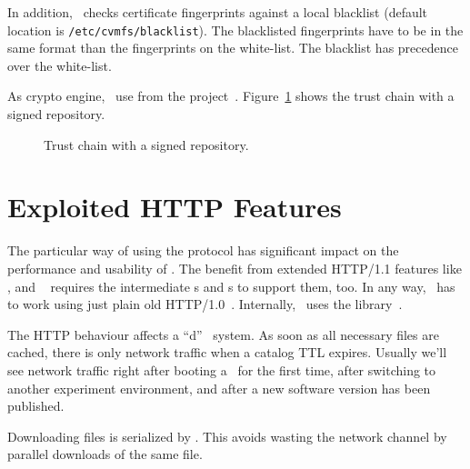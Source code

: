 In addition, \cvmfs\ checks certificate fingerprints against a local blacklist (default location is \texttt{/etc/cvmfs/blacklist}).
The blacklisted fingerprints have to be in the same format than the fingerprints on the white-list.
The blacklist has precedence over the white-list.

As crypto engine, \cvmfs\ use  from the  project~\cite{openssl}.
Figure~\ref{fig:security} shows the trust chain with a signed repository.
\begin{figure}
	\begin{center}
		
	\end{center}
	\caption{Trust chain with a signed repository.}
	\label{fig:security}
\end{figure}



\section{Exploited HTTP Features}
The particular way of using the  protocol has significant impact on the performance and usability of \cvmfs.
The benefit from extended HTTP/1.1 features like ,  and ~\cite{rfc2616} requires the intermediate s and s to support them, too.
In any way, \cvmfs\ has to work using just plain old HTTP/1.0~\cite{rfc1945}.
Internally, \cvmfs\ uses the  library~\cite{libcurl}.

The HTTP behaviour affects a ``d'' \cvmfs\ system.
As soon as all necessary files are cached, there is only network traffic when a catalog TTL expires.
Usually we'll see network traffic right after booting a \cernvm\ for the first time, after switching to another experiment environment, and after a new software version has been published.

Downloading files is serialized by \cvmfs.
This avoids wasting the network channel by parallel downloads of the same file.


